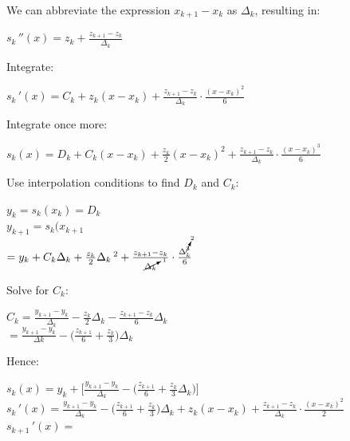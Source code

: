 \documentclass[a4paper,12pt,]{report}
\begin{document}
	\noindent We can abbreviate the expression $x_{k+1}-x_k$ as $\Delta_k$, resulting in:

\begin{center}
	$s_k\, ''(x)= z_k +\frac{z_{k+1}-z_k}{\Delta_k}$
\end{center}

	\noindent Integrate:
\begin{center}
	$s_k\, '(x) = C_k + z_k(x-x_k) + \frac{z_{k+1}-z_k}{\Delta_k} \cdot \frac{(x-x_k)^2}{6} $
\end{center}

	\noindent Integrate once more:

\begin{center}
	$s_k(x) = D_k +  C_k(x-x_k) + \frac{z_k}{2}(x-x_k)^2 + \frac{z_{k+1}-z_k}{\Delta_k} \cdot \frac{(x-x_k)^3}{6} $
\end{center}

	\noindent Use interpolation conditions to find $D_k$ and $C_k$:

\begin{center}
	$y_k = s_k(x_k)=D_k$\\
	\medskip
	$y_{k+1} = s_k(x_{k+1}$\\
	$= y_k + C_k \Delta_k + \frac{z_k}{2}\Delta_k\, ^2 + \frac{z_{k+1}-z_k}{\cancelto{1}{\Delta_k}} \cdot
		 \frac{\Delta_k^{\cancelto{2}{3}}}{6}$
\end{center}

	\noindent Solve for $C_k$:

\begin{center}
	$C_k = \frac{y_{k+1}-y_k}{\Delta_k} - \frac{z_k}{2}\Delta_k - \frac{z_{k+1}-z_k}{6}\Delta_k$\\
	\bigskip
	$= \frac{y_{k+1}-y_k}{\Delta k} - \Big( \frac{z_{k+1}}{6} + \frac{z_k}{3}    \Big)\Delta_k$
\end{center}

	\noindent Hence:

\begin{center}
	$s_k(x) = y_k +\Big[ \frac{y_{k+1} - y_k}{\Delta_k} - \big( \frac{z_{k+1}}{6} + \frac{z_k}{3} \Delta_k \big) \Big]$\\
\bigskip
	$s_k\, '(x) = \frac{y_{k+1} - y_k}{\Delta_k} - \big( \frac{z_{k+1}}{6} + \frac{z_k}{3} \big) \Delta_k + z_k(x-x_k)
		+ \frac{z_{k+1} - z_k}{\Delta_k}\cdot \frac{(x-x_k)^2}{2}$\\
	\bigskip
	$s_{k+1}\, '(x) = \frac{}{}$\\
\end{center}
\end{document}

